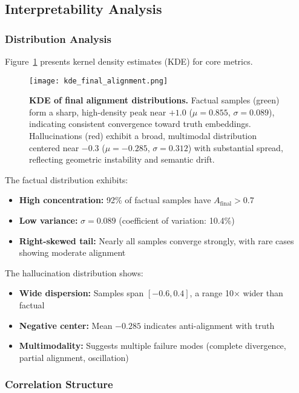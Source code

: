 \documentclass[11pt]{article}
\begin{document}
\subsection{Interpretability Analysis}

\subsubsection{Distribution Analysis}

Figure~\ref{fig:distributions} presents kernel density estimates (KDE) for core metrics.

\begin{figure}[h]
\centering
\texttt{[image: kde\_final\_alignment.png]}
\caption{\textbf{KDE of final alignment distributions.} Factual samples (green) form a sharp, high-density peak near $+1.0$ ($\mu = 0.855$, $\sigma = 0.089$), indicating consistent convergence toward truth embeddings. Hallucinations (red) exhibit a broad, multimodal distribution centered near $-0.3$ ($\mu = -0.285$, $\sigma = 0.312$) with substantial spread, reflecting geometric instability and semantic drift.}
\label{fig:distributions}
\end{figure}

The factual distribution exhibits:
\begin{itemize}[leftmargin=*]
    \item \textbf{High concentration:} 92\% of factual samples have $A_{\text{final}} > 0.7$
    \item \textbf{Low variance:} $\sigma = 0.089$ (coefficient of variation: 10.4\%)
    \item \textbf{Right-skewed tail:} Nearly all samples converge strongly, with rare cases showing moderate alignment
\end{itemize}

The hallucination distribution shows:
\begin{itemize}[leftmargin=*]
    \item \textbf{Wide dispersion:} Samples span $[-0.6, 0.4]$, a range 10$\times$ wider than factual
    \item \textbf{Negative center:} Mean $-0.285$ indicates anti-alignment with truth
    \item \textbf{Multimodality:} Suggests multiple failure modes (complete divergence, partial alignment, oscillation)
\end{itemize}

\subsubsection{Correlation Structure}
\end{document}
